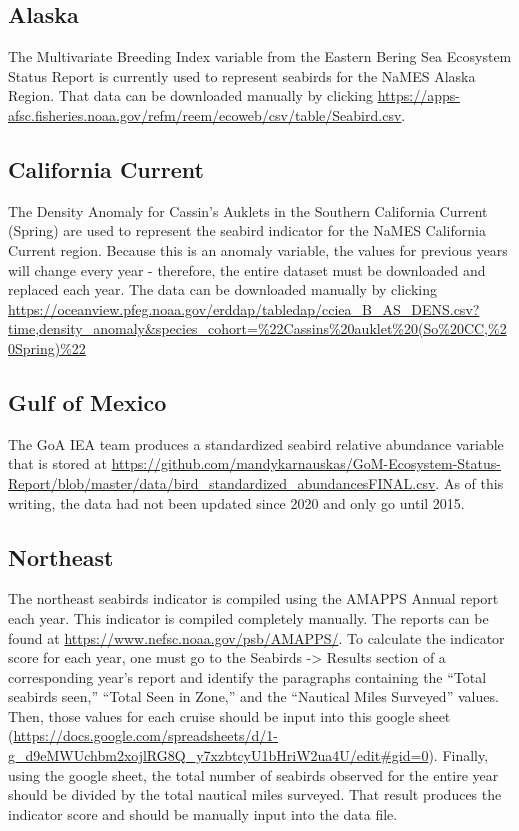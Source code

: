 \documentclass[
]{book}
\begin{document}
\hypertarget{alaska-2}{%
\subsection{Alaska}\label{alaska-2}}

The Multivariate Breeding Index variable from the Eastern Bering Sea Ecosystem Status Report is currently used to represent seabirds for the NaMES Alaska Region. That data can be downloaded manually by clicking \url{https://apps-afsc.fisheries.noaa.gov/refm/reem/ecoweb/csv/table/Seabird.csv}.

\hypertarget{california-current-2}{%
\subsection{California Current}\label{california-current-2}}

The Density Anomaly for Cassin's Auklets in the Southern California Current (Spring) are used to represent the seabird indicator for the NaMES California Current region. Because this is an anomaly variable, the values for previous years will change every year - therefore, the entire dataset must be downloaded and replaced each year. The data can be downloaded manually by clicking \url{https://oceanview.pfeg.noaa.gov/erddap/tabledap/cciea_B_AS_DENS.csv?time,density_anomaly\&species_cohort=\%22Cassins\%20auklet\%20(So\%20CC,\%20Spring)\%22}

\hypertarget{gulf-of-mexico-2}{%
\subsection{Gulf of Mexico}\label{gulf-of-mexico-2}}

The GoA IEA team produces a standardized seabird relative abundance variable that is stored at \url{https://github.com/mandykarnauskas/GoM-Ecosystem-Status-Report/blob/master/data/bird_standardized_abundancesFINAL.csv}. As of this writing, the data had not been updated since 2020 and only go until 2015.

\hypertarget{northeast-2}{%
\subsection{Northeast}\label{northeast-2}}

The northeast seabirds indicator is compiled using the AMAPPS Annual report each year. This indicator is compiled completely manually. The reports can be found at \url{https://www.nefsc.noaa.gov/psb/AMAPPS/}. To calculate the indicator score for each year, one must go to the Seabirds -\textgreater{} Results section of a corresponding year's report and identify the paragraphs containing the ``Total seabirds seen,'' ``Total Seen in Zone,'' and the ``Nautical Miles Surveyed'' values. Then, those values for each cruise should be input into this google sheet (\url{https://docs.google.com/spreadsheets/d/1-g_d9eMWUchbm2xojlRG8Q_y7xzbtcyU1bHriW2ua4U/edit\#gid=0}). Finally, using the google sheet, the total number of seabirds observed for the entire year should be divided by the total nautical miles surveyed. That result produces the indicator score and should be manually input into the data file.
\end{document}
